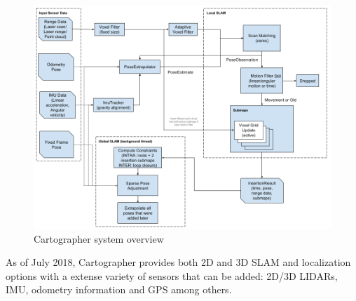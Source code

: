 \begin{figure}[t]
  \centering
  \includegraphics[width=.9\linewidth]{pictures/03/cartographersch}
  \caption{Cartographer system overview}
  \label{fig:cartographersch}
\end{figure}

As of July 2018, Cartographer provides both 2D and 3D SLAM and localization options with a extense variety of sensors that can be added: 2D/3D LIDARs, IMU, odometry information and GPS among others.

